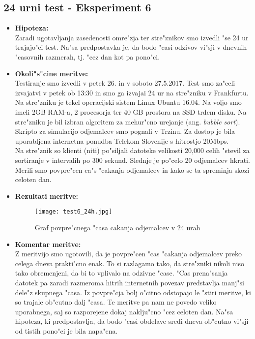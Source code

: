 \newpage
\subsection{24 urni test - Eksperiment 6}
\begin{itemize}
	\item \textbf{Hipoteza: }  \\
		Zaradi ugotavljanja zasedenosti omre"zja ter stre"znikov smo izvedli "se 24 ur trajajo"ci test. Na"sa predpostavka je, da bodo "casi odzivov vi"sji v dnevnih "casovnih razmerah, tj. "cez dan kot pa pono"ci.
			
	\item \textbf{Okoli"s"cine meritve: } \\
		Testiranje smo izvedli v petek 26. in v soboto 27.5.2017. Test smo za"celi izvajatvi v petek ob 13:30 in smo ga izvajai 24 ur na stre"zniku v Frankfurtu. Na stre"zniku je tekel operacijski sistem Linux Ubuntu 16.04. Na voljo smo imeli 2GB RAM-a, 2 procesorja ter 40 GB prostora na SSD trdem disku. Na stre"zniku je bil izbran algoritem za mehur"cno urejanje (ang. \textit{bubble sort}).\\ Skripto za simulacijo odjemalcev smo pognali v Trzinu. Za dostop je bila uporabljena internetna ponudba Telekom Slovenije s hitrostjo 20Mbps.\\ Na stre"znik so klienti (niti) po"siljali datoteke velikosti 20,000 celih "stevil za sortiranje v intervalih po 300 sekund. Slednje je po"celo 20 odjemalcev hkrati. Merili smo povpre"cen ca"s "cakanja odjemalcev in kako se ta spreminja skozi celoten dan. 

 	\item \textbf{Rezultati meritve: }  \\
		\begin{figure}[h]
  		\centering
  		  \texttt{[image: test6\_24h.jpg]}
  		\caption{Graf povpre"cnega "casa cakanja odjemalcev v 24 urah }
  		\label{8_graf_racunska_moc_50}
		\end{figure}

	\item \textbf{Komentar meritve: } \\ 
		Z meritvijo smo ugotovili, da je povpre"cen "cas "cakanja odjemalcev preko celega dneva prakti"cno enak. To si razlagamo tako, da stre"zniki nikoli niso tako obremenjeni, da bi to vplivalo na odzivne "case. "Cas prena"sanja datotek pa zaradi razmeroma hitrih internetnih povezav predstavlja manj"si dele"z skupnega "casa. Iz povpre"cja bolj o"citno odstopajo le "stiri meritve, ki so trajale ob"cutno dalj "casa. Te meritve pa nam ne povedo veliko uporabnega, saj so razporejene dokaj naklju"cno "cez celoten dan. Na"sa hipoteza, ki predpostavlja, da bodo "casi obdelave sredi dneva ob"cutno vi"sji od tistih pono"ci je bila napa"cna.
\end{itemize}


